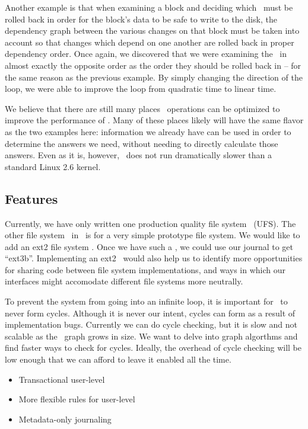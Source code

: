 Another example is that when examining a block and deciding which \chdescs\ must
be rolled back in order for the block's data to be safe to write to the disk,
the dependency graph between the various changes on that block must be taken
into account so that changes which depend on one another are rolled back in
proper dependency order. Once again, we discovered that we were examining the
\chdescs\ in almost exactly the opposite order as the order they should be
rolled back in -- for the same reason as the previous example. By simply
changing the direction of the loop, we were able to improve the loop from
quadratic time to linear time.

We believe that there are still many places \chdesc\ operations can be optimized
to improve the performance of \Kudos. Many of these places likely will have the
same flavor as the two examples here: information we already have can be used in
order to determine the answers we need, without needing to directly calculate
those answers. Even as it is, however, \Kudos\ does not run dramatically slower
than a standard Linux 2.6 kernel.


\subsection {Features}
Currently, we have only written one production quality file system \module\
(UFS). The other file system \module\ in \Kudos\ is for a very simple prototype
file system. We would like to add an ext2 file system \module. Once we have such
a \module, we could use our journal \module to get ``ext3b''. Implementing an
ext2 \module\ would also help us to identify more opportunities for sharing code
between file system implementations, and ways in which our interfaces might
accomodate different file systems more neutrally.

To prevent the system from going into an infinite loop, it is important for
\chdescs\ to never form cycles. Although it is never our intent, cycles can
form as a result of implementation bugs. Currently we can do cycle checking,
but it is slow and not scalable as the \chdesc\ graph grows in size. We want to
delve into graph algorthms and find faster ways to check for cycles. Ideally,
the overhead of cycle checking will be low enough that we can afford to leave
it enabled all the time.

\begin{itemize}
\item Transactional user-level \chdescs
\item More flexible rules for user-level \chdescs
\item Metadata-only journaling
\end{itemize}
